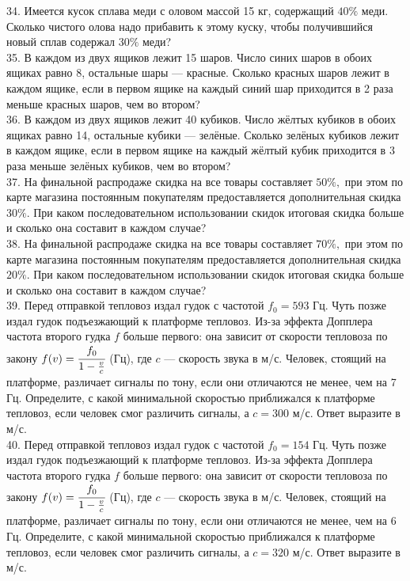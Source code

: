 34. Имеется кусок сплава меди с оловом массой 15 кг, содержащий $40\%$ меди. Сколько чистого олова надо прибавить к этому куску, чтобы получившийся новый сплав содержал $30\%$ меди?\\
35. В каждом из двух ящиков лежит 15 шаров. Число синих шаров в обоих ящиках равно 8, остальные шары --- красные. Сколько красных шаров лежит в каждом ящике, если в первом ящике на каждый синий шар приходится в 2 раза меньше красных шаров, чем во втором?\\
36. В каждом из двух ящиков лежит 40 кубиков. Число жёлтых кубиков в обоих ящиках равно 14, остальные кубики --- зелёные. Сколько зелёных кубиков лежит в каждом ящике, если в первом ящике на каждый жёлтый кубик приходится в 3 раза меньше зелёных кубиков, чем во втором?\\
37. На финальной распродаже скидка на все товары составляет $50\%,$ при этом по карте магазина постоянным покупателям предоставляется дополнительная скидка $30\%.$ При каком последовательном использовании скидок итоговая скидка больше и сколько она составит в каждом случае?\\
38. На финальной распродаже скидка на все товары составляет $70\%,$ при этом по карте магазина постоянным покупателям предоставляется дополнительная скидка $20\%.$ При каком последовательном использовании скидок итоговая скидка больше и сколько она составит в каждом случае?\\
39. Перед отправкой тепловоз издал гудок с частотой $f_0=593$ Гц. Чуть позже издал гудок подъезжающий к платформе тепловоз. Из-за эффекта Допплера частота второго гудка $f$ больше первого: она зависит от скорости тепловоза по закону $f(v)=\cfrac{f_0}{1-\frac{v}{c}}$ (Гц), где $c$ --- скорость звука в м/с. Человек, стоящий на платформе, различает сигналы по тону, если они отличаются не менее, чем на 7 Гц. Определите, с какой минимальной скоростью приближался к платформе тепловоз, если человек смог различить сигналы, а $c=300$ м/с. Ответ выразите в м/с.\\
40. Перед отправкой тепловоз издал гудок с частотой $f_0=154$ Гц. Чуть позже издал гудок подъезжающий к платформе тепловоз. Из-за эффекта Допплера частота второго гудка $f$ больше первого: она зависит от скорости тепловоза по закону $f(v)=\cfrac{f_0}{1-\frac{v}{c}}$ (Гц), где $c$ --- скорость звука в м/с. Человек, стоящий на платформе, различает сигналы по тону, если они отличаются не менее, чем на 6 Гц. Определите, с какой минимальной скоростью приближался к платформе тепловоз, если человек смог различить сигналы, а $c=320$ м/с. Ответ выразите в м/с.\\
